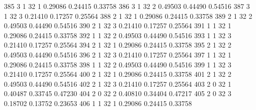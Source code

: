 \documentclass{article}
\begin{document}
\begin{Woutput}
 385      3       1      32       1       0.29086    0.24415    0.33758
 386      3       1      32       2       0.49503    0.44490    0.54516
 387      3       1      32       3       0.21410    0.17257    0.25564
 388      2       1      32       1       0.29086    0.24415    0.33758
 389      2       1      32       2       0.49503    0.44490    0.54516
 390      2       1      32       3       0.21410    0.17257    0.25564
 391      1       1      32       1       0.29086    0.24415    0.33758
 392      1       1      32       2       0.49503    0.44490    0.54516
 393      1       1      32       3       0.21410    0.17257    0.25564
 394      2       1      32       1       0.29086    0.24415    0.33758
 395      2       1      32       2       0.49503    0.44490    0.54516
 396      2       1      32       3       0.21410    0.17257    0.25564
 397      1       1      32       1       0.29086    0.24415    0.33758
 398      1       1      32       2       0.49503    0.44490    0.54516
 399      1       1      32       3       0.21410    0.17257    0.25564
 400      2       1      32       1       0.29086    0.24415    0.33758
 401      2       1      32       2       0.49503    0.44490    0.54516
 402      2       1      32       3       0.21410    0.17257    0.25564
 403      2       0      32       1       0.40487    0.33745    0.47230
 404      2       0      32       2       0.40810    0.34404    0.47217
 405      2       0      32       3       0.18702    0.13752    0.23653
 406      1       1      32       1       0.29086    0.24415    0.33758


\end{Woutput}
\end{document}
